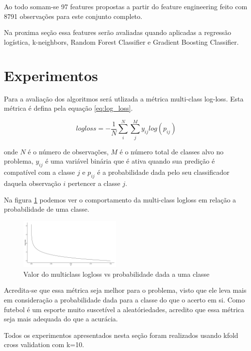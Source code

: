 \documentclass{article}
\begin{document}
Ao todo somam-se 97 features propostas a partir do feature engineering feito com 8791 observações para este conjunto completo. 

Na proxima seção essa features serão avaliadas quando aplicadas a regressão logística, k-neighbors, Random Forest Classifier e Gradient Boosting Classifier.

\section{Experimentos}

 Para a avaliação dos algoritmos será utlizada a métrica multi-class log-loss. Esta métrica é defina pela equação \ref{eq:log_loss}.
 
 \begin{equation}
 \label{eq:log_loss}
 logloss = -\frac{1}{N} \sum_{i}^{N}\sum_{j}^{M}y_{ij}log(p_{ij})
 \end{equation}

onde $N$ é o número de observações, $M$ é o número total de classes alvo no problema, $y_{ij}$ é uma variável binária que é ativa quando sua predição é compatível com a classe $j$ e $p_{ij}$ é a probabilidade dada pelo seu classificador daquela observação $i$ pertencer a classe $j$.

Na figura \ref{fig:logloss} podemos ver o comportamento da multi-class logloss em relação a probabilidade de uma classe.

\begin{figure}[!h]
	\centering
	\includegraphics[width=0.45\textwidth]{./04-figuras/log-loss-curve.png}
	\caption{Valor do multiclass logloss vs probabilidade dada a uma classe}
	\label{fig:logloss}
\end{figure}

Acredita-se que essa métrica seja melhor para o problema, visto que ele leva mais em consideração a probabilidade dada para a classe do que o acerto em si. Como futebol é um esporte muito suscetível a aleatóriedades, acredito que essa métrica seja mais adequada do que a acurácia.

Todos os experimentos apresentados nesta seção foram realizados usando kfold cross validation com k=10.
\end{document}
